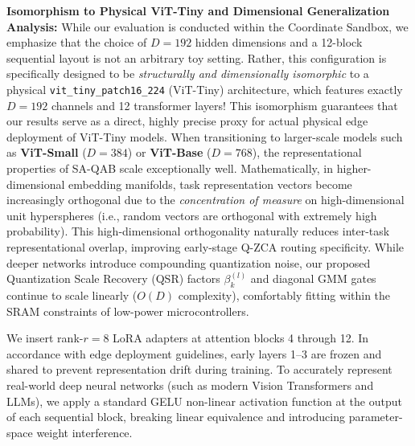 \textbf{Isomorphism to Physical ViT-Tiny and Dimensional Generalization Analysis:} While our evaluation is conducted within the Coordinate Sandbox, we emphasize that the choice of $D=192$ hidden dimensions and a 12-block sequential layout is not an arbitrary toy setting. Rather, this configuration is specifically designed to be \emph{structurally and dimensionally isomorphic} to a physical \texttt{vit\_tiny\_patch16\_224} (ViT-Tiny) architecture, which features exactly $D=192$ channels and 12 transformer layers! This isomorphism guarantees that our results serve as a direct, highly precise proxy for actual physical edge deployment of ViT-Tiny models. When transitioning to larger-scale models such as \textbf{ViT-Small} ($D=384$) or \textbf{ViT-Base} ($D=768$), the representational properties of SA-QAB scale exceptionally well. Mathematically, in higher-dimensional embedding manifolds, task representation vectors become increasingly orthogonal due to the \emph{concentration of measure} on high-dimensional unit hyperspheres (i.e., random vectors are orthogonal with extremely high probability). This high-dimensional orthogonality naturally reduces inter-task representational overlap, improving early-stage Q-ZCA routing specificity. While deeper networks introduce compounding quantization noise, our proposed Quantization Scale Recovery (QSR) factors $\beta_k^{(l)}$ and diagonal GMM gates continue to scale linearly ($O(D)$ complexity), comfortably fitting within the SRAM constraints of low-power microcontrollers.

We insert rank-$r = 8$ LoRA adapters \cite{lora} at attention blocks 4 through 12. In accordance with edge deployment guidelines, early layers 1--3 are frozen and shared to prevent representation drift during training. To accurately represent real-world deep neural networks (such as modern Vision Transformers and LLMs), we apply a standard GELU non-linear activation function at the output of each sequential block, breaking linear equivalence and introducing parameter-space weight interference.

